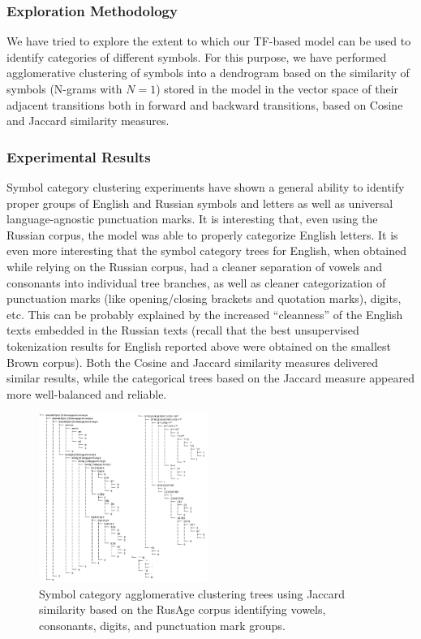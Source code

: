 \documentclass[11pt]{article}
\begin{document}
\subsubsection{Exploration Methodology}

We have tried to explore the extent to which our TF-based model can be used to identify categories of different symbols. For this purpose, we have performed agglomerative clustering of symbols into a dendrogram based on the similarity of symbols (N-grams with $N=1$) stored in the model in the vector space of their adjacent transitions both in forward and backward transitions, based on Cosine and Jaccard similarity measures.

\subsubsection{Experimental Results}

Symbol category clustering experiments have shown a general ability to identify proper groups of English and Russian symbols and letters as well as universal language-agnostic punctuation marks. It is interesting that, even using the Russian corpus, the model was able to properly categorize English letters. It is even more interesting that the symbol category trees for English, when obtained while relying on the Russian corpus, had a cleaner separation of vowels and consonants into individual tree branches, as well as cleaner categorization of punctuation marks (like opening/closing brackets and quotation marks), digits, etc. This can be probably explained by the increased “cleanness” of the English texts embedded in the Russian texts (recall that the best unsupervised tokenization results for English reported above were obtained on the smallest Brown corpus). Both the Cosine and Jaccard similarity measures delivered  similar results, while the categorical trees based on the Jaccard measure appeared more well-balanced and reliable.

\begin{figure}
  \includegraphics[width=0.49\textwidth]{emnlp2022/imgs/figure9.png}
  \caption{Symbol category agglomerative clustering trees using Jaccard similarity based on the RusAge corpus identifying vowels, consonants, digits, and punctuation mark groups.}
\end{figure}
\end{document}
